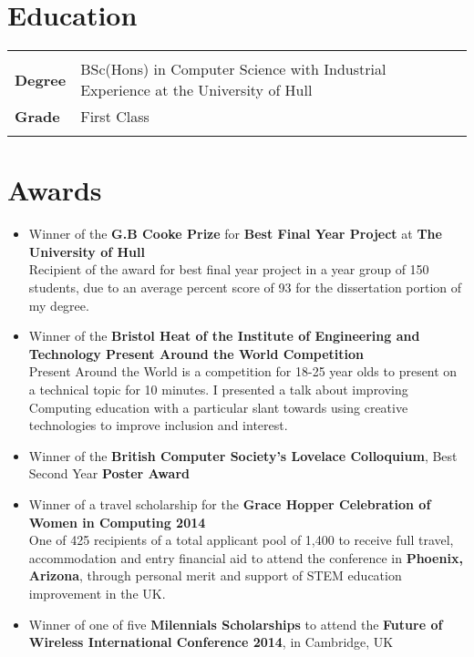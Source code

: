 \documentclass{article}
\begin{document}
\begin{flushleft}
\section*{Education}
\begin{tabular}{@{}ll@{}}
    \multicolumn{2}{l}{}\\
    \textbf{Degree} &BSc(Hons) in Computer Science with Industrial Experience at the University of Hull  \\
    \textbf{Grade} &First Class   \\
    &\\
\end{tabular}

\section*{Awards}
\begin{itemize}
\item Winner of the \textbf{G.B Cooke Prize} for \textbf{Best Final Year Project} at \textbf{The University of Hull}\\
\small Recipient of the award for best final year project in a year group of 150 students, due to an average percent score of 93 for the dissertation portion of my degree. 
\item Winner of the \textbf{Bristol Heat of the Institute of Engineering and Technology Present Around the World Competition} \\
\small Present Around the World is a competition for 18-25 year olds to present on a technical topic for 10 minutes. I presented a talk about improving Computing education with a particular slant towards using creative technologies to improve inclusion and interest.
\item \normalsize Winner of the \textbf{British Computer Society's Lovelace Colloquium}, Best Second Year \textbf{Poster Award}
\item Winner of a travel scholarship for the \textbf{Grace Hopper Celebration of Women in Computing 2014}\\
 \small One of 425 recipients of a total applicant pool of 1,400 to receive full travel,  accommodation and entry financial aid to attend the conference in \textbf{Phoenix, Arizona}, through personal merit and support of STEM education improvement in the UK.
\item \normalsize Winner of one of five \textbf{Milennials Scholarships} to attend the \textbf{Future of Wireless International Conference 2014}, in Cambridge, UK 
\end{itemize}



\end{flushleft}
\end{document}
